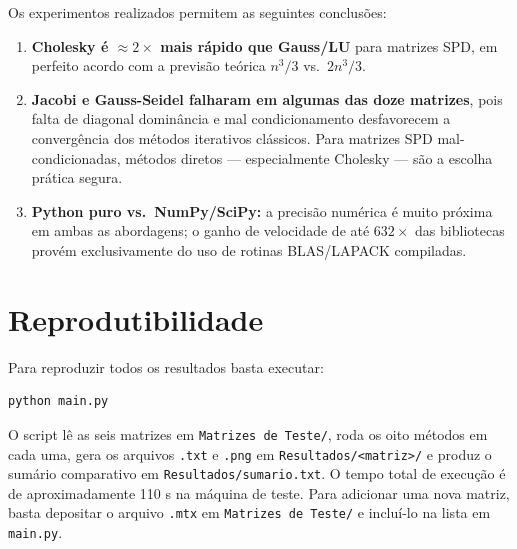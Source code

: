 \documentclass[12pt, a4paper]{article}
\begin{document}
Os experimentos realizados permitem as seguintes conclusões:
 
\begin{enumerate}
  \item \textbf{Cholesky é $\approx 2\times$ mais rápido que Gauss/LU} para matrizes
    SPD, em perfeito acordo com a previsão teórica $n^3/3$ vs.\ $2n^3/3$.
 
  \item \textbf{Jacobi e Gauss-Seidel falharam em algumas das doze matrizes}, pois
    falta de diagonal dominância e mal condicionamento desfavorecem a convergência dos
    métodos iterativos clássicos.
    Para matrizes SPD mal-condicionadas, métodos diretos
    — especialmente Cholesky — são a escolha prática segura.
 
  \item \textbf{Python puro vs.\ NumPy/SciPy:} a precisão numérica é muito próxima em
    ambas as abordagens; o ganho de velocidade de até $632\times$ das bibliotecas
    provém exclusivamente do uso de rotinas BLAS/LAPACK compiladas.
\end{enumerate}
 
\section*{Reprodutibilidade}
 
Para reproduzir todos os resultados basta executar:
 
\begin{verbatim}
python main.py
\end{verbatim}
 
O script lê as seis matrizes em \texttt{Matrizes de Teste/}, roda os oito métodos em
cada uma, gera os arquivos \texttt{.txt} e \texttt{.png} em
\texttt{Resultados/<matriz>/} e produz o sumário comparativo em
\texttt{Resultados/sumario.txt}. O tempo total de execução é de aproximadamente 110 s
na máquina de teste. Para adicionar uma nova matriz, basta depositar o arquivo
\texttt{.mtx} em \texttt{Matrizes de Teste/} e incluí-lo na lista em
\texttt{main.py}.
 
\end{document}
